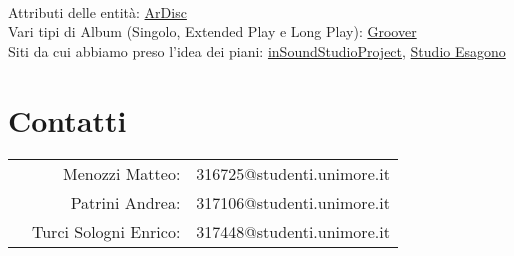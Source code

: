 \documentclass{article}
\begin{document}

\newpage
{}


\begin{tabular}{c}
\end{tabular}
\\
Attributi delle entità: \href{https://ardisc.it/musitalia/vistaHomePage.php}{ArDisc} \\
Vari tipi di Album (Singolo, Extended Play e Long Play):  \href{https://blog.groover.co/it/consigli-per-i-musicisti/ep-vs-album-it/}{Groover} \\
Siti da cui abbiamo preso l'idea dei piani: \href{https://insoundstudio.com/studio/tariffe-e-offerte}{inSoundStudioProject}, \href{https://www.studioesagono.com/studio/rates/}{Studio Esagono} \\



\newpage
\section*{Contatti}

\begin{tabular}{l r l}
& Menozzi Matteo: & 316725@studenti.unimore.it \\
& Patrini Andrea: & 317106@studenti.unimore.it \\
& Turci Sologni Enrico: & 317448@studenti.unimore.it
\end{tabular}
\end{document}

